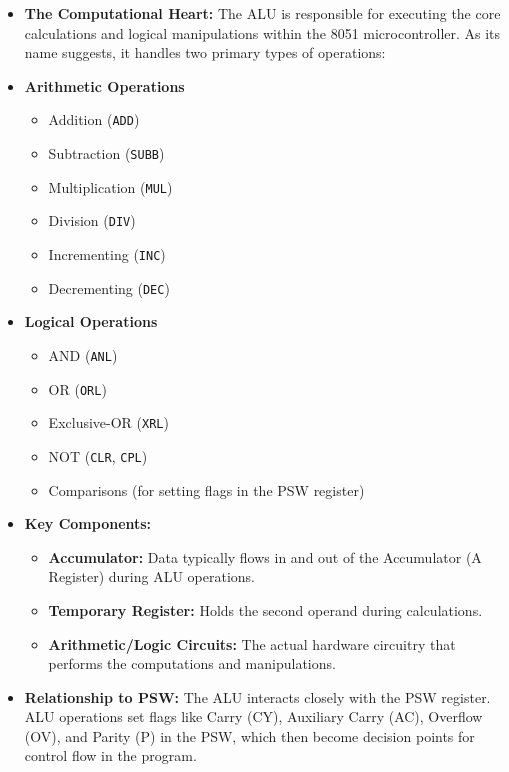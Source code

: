 \documentclass[
]{article}
\begin{document}
\begin{itemize}
\item
  \textbf{The Computational Heart:} The ALU is responsible for executing
  the core calculations and logical manipulations within the 8051
  microcontroller. As its name suggests, it handles two primary types of
  operations:
\item
  \textbf{Arithmetic Operations}

  \begin{itemize}
  \item
    Addition (\texttt{ADD})
  \item
    Subtraction (\texttt{SUBB})
  \item
    Multiplication (\texttt{MUL})
  \item
    Division (\texttt{DIV})
  \item
    Incrementing (\texttt{INC})
  \item
    Decrementing (\texttt{DEC})
  \end{itemize}
\item
  \textbf{Logical Operations}

  \begin{itemize}
  \item
    AND (\texttt{ANL})
  \item
    OR (\texttt{ORL})
  \item
    Exclusive-OR (\texttt{XRL})
  \item
    NOT (\texttt{CLR}, \texttt{CPL})
  \item
    Comparisons (for setting flags in the PSW register)
  \end{itemize}
\item
  \textbf{Key Components:}

  \begin{itemize}
  \item
    \textbf{Accumulator:} Data typically flows in and out of the
    Accumulator (A Register) during ALU operations.
  \item
    \textbf{Temporary Register:} Holds the second operand during
    calculations.
  \item
    \textbf{Arithmetic/Logic Circuits:} The actual hardware circuitry
    that performs the computations and manipulations.
  \end{itemize}
\item
  \textbf{Relationship to PSW:} The ALU interacts closely with the PSW
  register. ALU operations set flags like Carry (CY), Auxiliary Carry
  (AC), Overflow (OV), and Parity (P) in the PSW, which then become
  decision points for control flow in the program.
\end{itemize}
\end{document}
